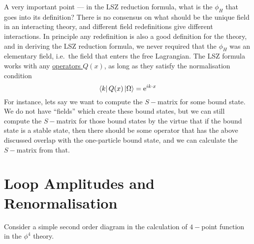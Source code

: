 \documentclass[11pt, notitlepage]{report}
\newcommand{\e}{\mathrm{e}}
\numberwithin{equation}{section}
\begin{document}
A very important point — in the LSZ reduction formula, what is the \(\phi_H\) that goes into its definition? There is no consensus on what should be the unique field in an interacting theory, and different field redefinitions give different interactions. In principle any redefinition is also a good definition for the theory, and in deriving the LSZ reduction formula, we never required that the \(\phi_H\) was an elementary field, i.e.\ the field that enters the free Lagrangian. The LSZ formula works with any \underline{operators \(Q(x)\)}, as long as they satisfy the normalisation condition
\begin{equation*}
    \bra{k}Q(x)\ket{\Omega} = \e^{ik\cdot x}
\end{equation*} 
For instance, lets say we want to compute the \(S-\)matrix for some bound state. We do not have ``fields'' which create these bound states, but we can still compute the \(S-\)matrix for those bound states by the virtue that if the bound state is a stable state, then there should be some operator that has the above discussed overlap with the one-particle bound state, and we can calculate the \(S-\)matrix from that. \\




\newpage
\section{Loop Amplitudes and Renormalisation}
Consider a simple second order diagram in the calculation of \(4-\)point function in the \(\phi^4\) theory. 
\begin{figure}[h]
    \centering
\end{figure}
\end{document}

